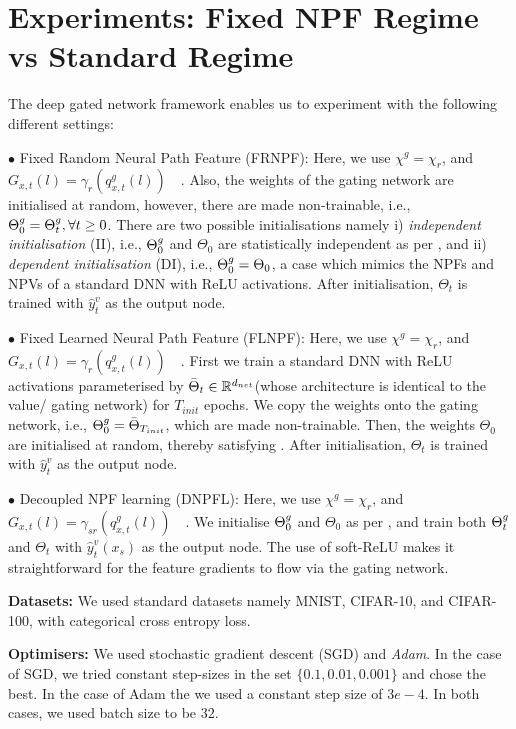 \section{Experiments: Fixed NPF Regime vs  Standard Regime}\label{sec:generalisation}
The deep gated network framework enables us to experiment with the following different settings:

$\bullet$ Fixed Random Neural Path Feature (FRNPF): Here, we use $\chi^g=\chi_r$, and $ G_{x,t}(l)= \gamma_{r}\left(q^g_{x,t}(l)\right)\quad$. Also, the weights of the gating network are initialised at random, however, there are made non-trainable, i.e., ${\Theta}^g_0={\Theta}^g_t,\forall t\geq 0$. There are two possible initialisations namely i) \emph{independent initialisation} (II), i.e., ${\Theta}^g_0$ and $\Theta_0$ are statistically independent as per , and ii) \emph{dependent initialisation} (DI), i.e., ${\Theta}^g_0=\Theta_0$, a case which mimics the NPFs and NPVs of a standard DNN with ReLU activations. After initialisation, $\Theta_t$ is trained with $\hat{y}^v_t$ as the output node.

$\bullet$  Fixed Learned Neural Path Feature (FLNPF): Here, we use $\chi^g=\chi_r$, and $ G_{x,t}(l)= \gamma_{r}\left(q^g_{x,t}(l)\right)\quad$. First we train a standard DNN with ReLU activations parameterised by $\bar{\Theta}_t\in\mathbb{R}^{d_{net}}$(whose architecture is identical to the value/ gating network) for $T_{init}$ epochs. We copy the weights onto the gating network, i.e., ${\Theta}^g_0=\bar{\Theta}_{T_{init}}$, which are made non-trainable. Then, the weights $\Theta_0$ are initialised at random, thereby satisfying . After initialisation, $\Theta_t$ is trained with $\hat{y}^v_t$ as the output node.

$\bullet$ Decoupled NPF learning (DNPFL): Here, we use $\chi^g=\chi_r$, and $ G_{x,t}(l)= \gamma_{sr}\left(q^g_{x,t}(l)\right)\quad$. We initialise ${\Theta}^g_0$ and $\Theta_0$ as per , and train both ${\Theta}^g_t$ and $\Theta_t$ with $\hat{y}^v_t(x_s)$ as the output node. The use of soft-ReLU makes it straightforward for the feature gradients to flow via the gating network.


\textbf{Datasets:} We used standard datasets namely MNIST, CIFAR-10, and CIFAR-100, with categorical cross entropy loss. 

\textbf{Optimisers:} We used stochastic gradient descent (SGD) and \emph{Adam}. In the case of SGD, we tried constant step-sizes in the set $\{0.1,0.01,0.001\}$ and chose the best. In the case of Adam the we used a constant step size of $3e-4$. In both cases, we used batch size to be $32$.

